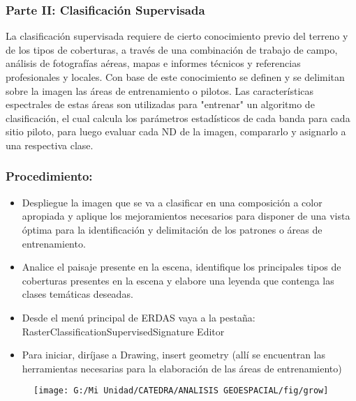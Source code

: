 \documentclass[a4paper,oneside,11pt,]{article}
\begin{document}
\subsubsection{Parte II: Clasificación Supervisada}
La clasificación supervisada requiere de cierto conocimiento previo del terreno y de los tipos de coberturas, a través de una combinación de trabajo de campo, análisis de fotografías aéreas, mapas e informes técnicos y referencias profesionales y locales. Con base de este conocimiento se definen y se delimitan sobre la imagen las áreas de entrenamiento o pilotos. Las características espectrales de estas áreas son utilizadas para "entrenar" un algoritmo de clasificación, el cual calcula los parámetros estadísticos de cada banda para cada sitio piloto, para luego evaluar cada ND de la imagen, compararlo y asignarlo a una respectiva clase.

\subsubsection{Procedimiento:}
\begin{itemize}
\item Despliegue la imagen que se va a clasificar en una composición a color apropiada y aplique los mejoramientos necesarios para disponer de una vista óptima para  la identificación y delimitación de los patrones o áreas de entrenamiento.
\item Analice el paisaje presente en la escena, identifique los principales tipos de coberturas presentes en la escena y elabore una leyenda que contenga las clases temáticas deseadas.
\item Desde el menú principal de ERDAS vaya a la pestaña:\\ Raster\textrightarrow Classification\textrightarrow Supervised\textrightarrow Signature Editor
\item Para iniciar, diríjase a Drawing, insert geometry (allí se encuentran las herramientas necesarias para la elaboración de las áreas de entrenamiento) 
\end{itemize}

\begin{figure}
\centering
\texttt{[image: G:/Mi Unidad/CATEDRA/ANALISIS GEOESPACIAL/fig/grow]}
\end{figure}
\end{document}
